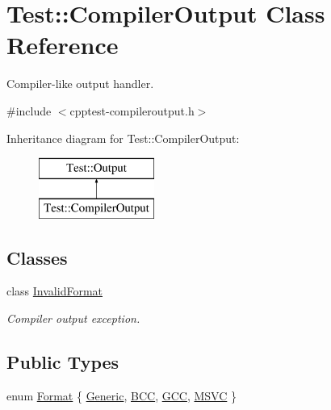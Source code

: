 \hypertarget{class_test_1_1_compiler_output}{}\section{Test\+:\+:Compiler\+Output Class Reference}
\label{class_test_1_1_compiler_output}


Compiler-\/like output handler.  




{\ttfamily \#include $<$cpptest-\/compileroutput.\+h$>$}

Inheritance diagram for Test\+:\+:Compiler\+Output\+:\begin{figure}[H]
\begin{center}
\leavevmode
\includegraphics[height=2.000000cm]{class_test_1_1_compiler_output}
\end{center}
\end{figure}
\subsection*{Classes}
\begin{DoxyCompactItemize}
\item 
class \mbox{\hyperlink{class_test_1_1_compiler_output_1_1_invalid_format}{Invalid\+Format}}
\begin{DoxyCompactList}\small\item\em Compiler output exception. \end{DoxyCompactList}\end{DoxyCompactItemize}
\subsection*{Public Types}
\begin{DoxyCompactItemize}
\item 
enum \mbox{\hyperlink{class_test_1_1_compiler_output_ab34cf506804cefbc67545a256af196ff}{Format}} \{ \mbox{\hyperlink{class_test_1_1_compiler_output_ab34cf506804cefbc67545a256af196ffa1a83926858dfb1bab06bc0a313a49dac}{Generic}}, 
\mbox{\hyperlink{class_test_1_1_compiler_output_ab34cf506804cefbc67545a256af196ffa9ad6dc16df2c992e8b77a3f6ee2247d8}{B\+CC}}, 
\mbox{\hyperlink{class_test_1_1_compiler_output_ab34cf506804cefbc67545a256af196ffa7d077829f643d60a87a022d39989dd3b}{G\+CC}}, 
\mbox{\hyperlink{class_test_1_1_compiler_output_ab34cf506804cefbc67545a256af196ffae4f7af0eaa05253ea35484384deeb86b}{M\+S\+VC}}
 \}
\end{DoxyCompactItemize}
